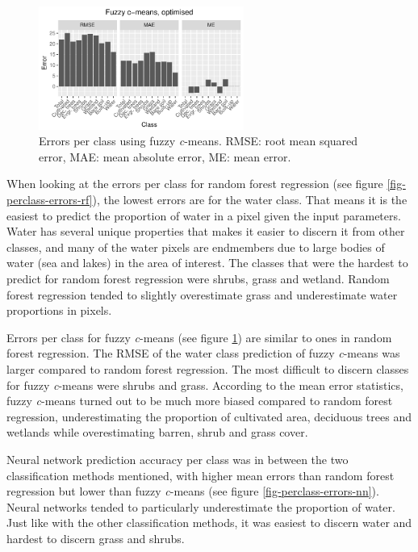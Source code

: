 \documentclass[a4paper,12pt]{scrbook}
\begin{document}
\begin{figure}
  \centering
  \includegraphics[width=0.6\textwidth]{../plot/perclass-errors-cm}
  \caption{Errors per class using fuzzy \textit{c}-means. RMSE: root mean squared error, MAE: mean absolute error, ME: mean error.}
  \label{fig-perclass-errors-cm}
\end{figure}

When looking at the errors per class for random forest regression (see figure \ref{fig-perclass-errors-rf}), the lowest errors are for the water class. That means it is the easiest to predict the proportion of water in a pixel given the input parameters. Water has several unique properties that makes it easier to discern it from other classes, and many of the water pixels are endmembers due to large bodies of water (sea and lakes) in the area of interest. The classes that were the hardest to predict for random forest regression were shrubs, grass and wetland. Random forest regression tended to slightly overestimate grass and underestimate water proportions in pixels.

Errors per class for fuzzy \textit{c}-means (see figure \ref{fig-perclass-errors-cm}) are similar to ones in random forest regression. The RMSE of the water class prediction of fuzzy \textit{c}-means was larger compared to random forest regression. The most difficult to discern classes for fuzzy \textit{c}-means were shrubs and grass. According to the mean error statistics, fuzzy \textit{c}-means turned out to be much more biased compared to random forest regression, underestimating the proportion of cultivated area, deciduous trees and wetlands while overestimating barren, shrub and grass cover.

Neural network prediction accuracy per class was in between the two classification methods mentioned, with higher mean errors than random forest regression but lower than fuzzy \textit{c}-means (see figure \ref{fig-perclass-errors-nn}). Neural networks tended to particularly underestimate the proportion of water. Just like with the other classification methods, it was easiest to discern water and hardest to discern grass and shrubs.
\end{document}
